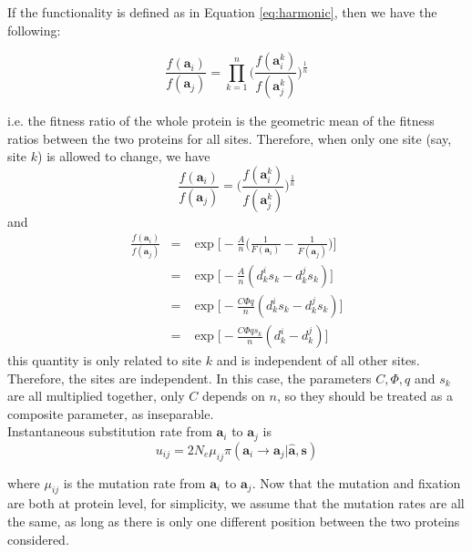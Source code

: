 \documentclass[13pt]{article}
\begin{document}
If the functionality is defined as in Equation \ref{eq:harmonic}, then we have the following:

\begin{equation}
\frac{f(\mathbf{a}_i)}{f(\mathbf{a}_j)} = \prod_{k=1}^n\Big( \frac{f(\mathbf{a}_i^k)}{f(\mathbf{a}_j^k)}\Big)^{\frac{1}{n}}
\end{equation}


i.e. the fitness ratio of the whole protein is the geometric mean of the fitness ratios between the two proteins for all sites. Therefore, when only one site (say, site $k$) is allowed to change, we have 
\[\frac{f(\mathbf{a}_i)}{f(\mathbf{a}_j)} = \Big( \frac{f(\mathbf{a}_i^k)}{f(\mathbf{a}_j^k)}\Big)^{\frac{1}{n}}\]
and
\begin{eqnarray}
\frac{f(\mathbf{a}_i)}{f(\mathbf{a}_j)} & = &\exp \Big[-\frac{A}{n}\Big( \frac{1}{F(\mathbf{a}_i )} - \frac{1}{F(\mathbf{a}_j )}\Big)\Big] \nonumber\\
& = & \exp\Big[ -\frac{A}{n}(d_k^i s_k - d_k^j s_k)\Big]\\
& = & \exp\Big[ -\frac{C\Phi q}{n}(d_k^i s_k - d_k^j s_k)\Big]\\
& = & \exp\Big[ -\frac{C\Phi q s_k}{n}(d_k^i - d_k^j)\Big]
\end{eqnarray}
\noindent
this quantity is only related to site $k$ and is independent of all other sites. Therefore, the sites are independent. In this case, the parameters $C, \Phi, q$ and $s_k$ are all multiplied together, only $C$ depends on $n$, so they should be treated as a composite parameter, as inseparable. \\

Instantaneous substitution rate from $\mathbf{a}_i$ to $\mathbf{a}_j$ is 
\begin{equation}
u_{ij} = 2N_e \mu_{ij} \pi(\mathbf{a}_i \rightarrow \mathbf{a}_j | \hat{\mathbf{a}}, \mathbf{s})
\label{eq:subrate}
\end{equation}

where $\mu_{ij}$ is the mutation rate from $\mathbf{a}_i$ to $\mathbf{a}_j$. Now that the mutation and fixation are both at protein level, for simplicity, we assume that the mutation rates are all the same, as long as there is only one different position between the two proteins considered. \\
\end{document}
